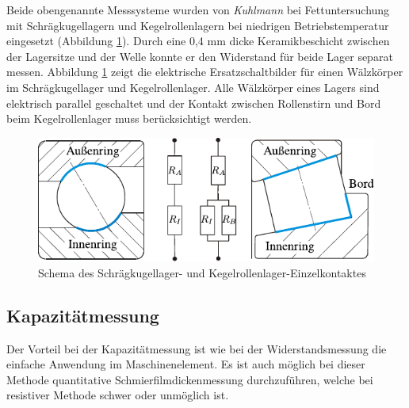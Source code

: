 Beide obengenannte Messsysteme wurden von \textit{Kuhlmann} bei Fettuntersuchung mit Schrägkugellagern und Kegelrollenlagern bei niedrigen Betriebstemperatur eingesetzt (Abbildung \ref{fig:schema_schraerikula_kerola_kuhlmann}).
Durch eine 0,4 mm dicke Keramikbeschicht zwischen der Lagersitze und der Welle konnte er den Widerstand für beide Lager separat messen.
Abbildung \ref{fig:schema_schraerikula_kerola_kuhlmann} zeigt die elektrische Ersatzschaltbilder für einen Wälzkörper im Schrägkugellager und Kegelrollenlager.
Alle Wälzkörper eines Lagers sind elektrisch parallel geschaltet und der Kontakt zwischen Rollenstirn und Bord beim Kegelrollenlager muss berücksichtigt werden.
\begin{figure}[htb]
    \centering
    \includegraphics[]{./images/schema_schraegrikula_kerola_kuhlmann.pdf}
    \caption{Schema des Schrägkugellager- und Kegelrollenlager-Einzelkontaktes \cite{kuhlmann_2009}}
    \label{fig:schema_schraerikula_kerola_kuhlmann}
\end{figure}
%

\subsection{Kapazitätmessung}
\label{sub:kapazitatmessung}

Der Vorteil bei der Kapazitätmessung ist wie bei der Widerstandsmessung die einfache Anwendung im Maschinenelement.
Es ist auch möglich bei dieser Methode quantitative Schmierfilmdickenmessung durchzuführen, welche bei resistiver Methode schwer oder unmöglich ist.

